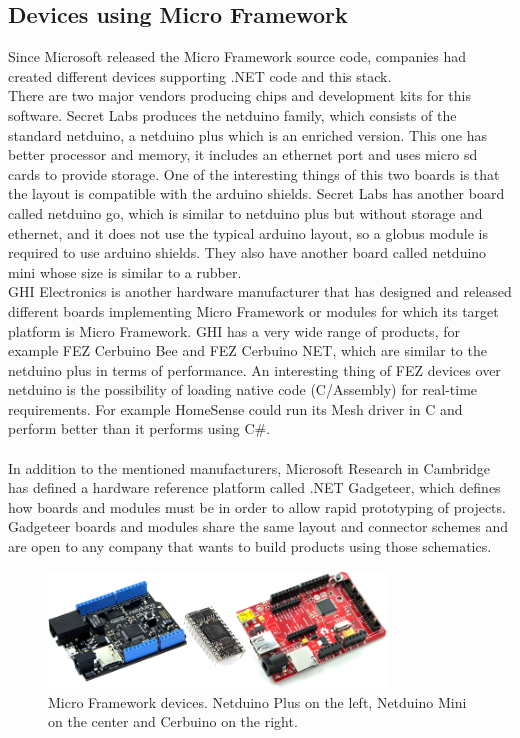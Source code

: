 \subsection{Devices using Micro Framework}\label{SS:SOTA-MicroFramework-Devices}
Since Microsoft released the Micro Framework source code, companies had created different devices supporting .NET code and this stack.
\\
There are two major vendors producing chips and development kits for this software. Secret Labs produces the netduino family, which consists of the standard netduino, a netduino plus which is an enriched version. This one has better processor and memory, it includes an ethernet port and uses micro sd cards to provide storage. One of the interesting things of this two boards is that the layout is compatible with the arduino shields.
Secret Labs has another board called netduino go, which is similar to netduino plus but without storage and ethernet, and it does not use the typical arduino layout, so a globus module is required to use arduino shields. They also have another board called netduino mini whose size is similar to a rubber.
\\
GHI Electronics is another hardware manufacturer that has designed and released different boards implementing Micro Framework or modules for which its target platform is Micro Framework. GHI has a very wide range of products, for example FEZ Cerbuino Bee and FEZ Cerbuino NET, which are similar to the netduino plus in terms of performance. An interesting thing of FEZ devices over netduino is the possibility of loading native code (C/Assembly) for real-time requirements. For example HomeSense could run its Mesh driver in C and perform better than it performs using C\#.
\\
\\
In addition to the mentioned manufacturers, Microsoft Research in Cambridge has defined a hardware reference platform called .NET Gadgeteer, which defines how boards and modules must be in order to allow rapid prototyping of projects. Gadgeteer boards and modules share the same layout and connector schemes and are open to any company that wants to build products using those schematics.
\begin{figure}[H]\begin{center}
 \centering
  \captionsetup{justification=centering}
  \includegraphics[width=0.8\textwidth]{pictures/stateoftheart/devices}
  \caption{Micro Framework devices. Netduino Plus on the left, Netduino Mini on the center and Cerbuino on the right.\label{fig:State-Art-NETMF-Boards}}
\end{center}\end{figure}

